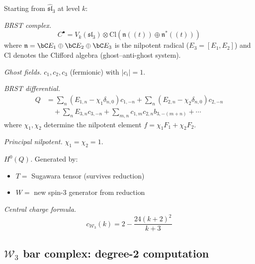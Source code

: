\begin{computation}\label{comp:ds-w3}
Starting from $\hat{\mathfrak{sl}}_3$ at level $k$:

\emph{BRST complex.}
\[
C^\bullet = V_k(\mathfrak{sl}_3) \otimes \mathrm{Cl}(\mathfrak{n}((t)) \oplus \mathfrak{n}^*((t)))
\]
where $\mathfrak{n} = \bC E_1 \oplus \bC E_2 \oplus \bC E_3$ is the nilpotent radical ($E_3 = [E_1, E_2]$) and $\mathrm{Cl}$ denotes the Clifford algebra (ghost--anti-ghost system).

\emph{Ghost fields.} $c_1, c_2, c_3$ (fermionic) with $|c_i| = 1$.

\emph{BRST differential.}
\begin{align*}
Q &= \sum_n (E_{1,n} - \chi_1\delta_{n,0})c_{1,-n} + \sum_n (E_{2,n} - \chi_2\delta_{n,0})c_{2,-n} \\
&\quad + \sum_n E_{3,n} c_{3,-n} + \sum_{m,n} c_{1,m}c_{2,n}b_{3,-(m+n)} + \cdots
\end{align*}
where $\chi_1, \chi_2$ determine the nilpotent element $f = \chi_1 F_1 + \chi_2 F_2$.

\emph{Principal nilpotent.} $\chi_1 = \chi_2 = 1$.

\emph{$H^0(Q)$.} Generated by:
\begin{itemize}
\item $T = $ Sugawara tensor (survives reduction)
\item $W = $ new spin-3 generator from reduction
\end{itemize}

\emph{Central charge formula.}
\[
c_{\mathcal{W}_3}(k) = 2 - \frac{24(k+2)^2}{k+3}
\]
\end{computation}


\subsection{\texorpdfstring{$\mathcal{W}_3$ bar complex: degree-2 computation}{W-3 bar complex: degree-2 computation}}


